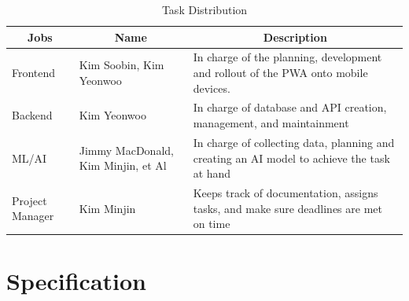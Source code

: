 \documentclass[conference]{IEEEtran}
\begin{document}
    \begin{table}[!h] 
        \caption{Task Distribution}
            \begin{center}
                \small
                \setlength{\tabcolsep}{6pt}
                \renewcommand{\arraystretch}{1.3}
                    \begin{tabular}{|p{2cm}|p{1.5cm}|p{4cm}|}
                    \hline
                    \multicolumn{1}{|c|}{\textbf{Jobs}} & \multicolumn{1}{c|}{\textbf{Name}} & \multicolumn{1}{c|}{\textbf{Description}} \\ \hline
                    \centering Frontend & \centering Kim Soobin, Kim Yeonwoo & In charge of the planning, development and rollout of the PWA onto mobile devices. \\ \hline
                    \centering Backend & \centering Kim Yeonwoo & In charge of database and API creation, management, and maintainment \\ \hline
                    \centering ML/AI & \centering Jimmy MacDonald, Kim Minjin, et Al & In charge of collecting data, planning and creating an AI model to achieve the task at hand \\ \hline
                    \centering Project Manager & \centering Kim Minjin & Keeps track of documentation, assigns tasks, and make sure deadlines are met on time \\ \hline
                    \end{tabular}%
                \label{tab:task_distribution} %
            \end{center}
        \end{table}

\section{Specification}
\end{document}
